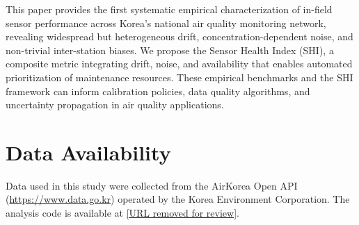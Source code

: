 \documentclass[12pt]{article}
\begin{document}
This paper provides the first systematic empirical characterization of in-field sensor performance across Korea's national air quality monitoring network, revealing widespread but heterogeneous drift, concentration-dependent noise, and non-trivial inter-station biases. We propose the Sensor Health Index (SHI), a composite metric integrating drift, noise, and availability that enables automated prioritization of maintenance resources. These empirical benchmarks and the SHI framework can inform calibration policies, data quality algorithms, and uncertainty propagation in air quality applications.

\section*{Data Availability}
Data used in this study were collected from the AirKorea Open API (\url{https://www.data.go.kr}) operated by the Korea Environment Corporation. The analysis code is available at \url{[URL removed for review]}.
\end{document}
